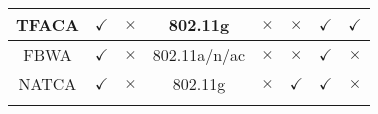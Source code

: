 \begin{table*}
\begin{tabular}{|c|c|c|c|c|c|c|c|}
		TFACA \cite{CA-VTC-14}&$\checkmark$&$\times$&802.11g&$\times$&$\times$&$\checkmark$&$\checkmark$\\\hline		
		FBWA \cite{CA-BW-VTC-14}&$\checkmark$&$\times$&802.11a/n/ac&$\times$&$\times$&$\checkmark$&$\times$\\\hline		
		NATCA \cite{DCA-residential-2015}&$\checkmark$&$\times$&802.11g&$\times$&$\checkmark$&$\checkmark$&$\times$ 
		\\\Xhline{3\arrayrulewidth}
	\end{tabular}
\end{table*}